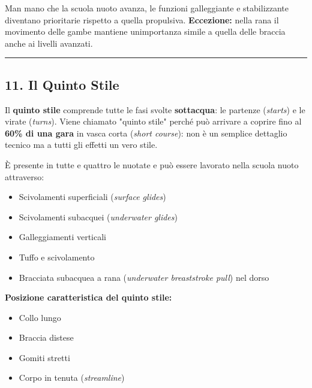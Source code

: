 \documentclass[a4paper,11pt]{article}
\providecommand{\tightlist}{%
  \setlength{\itemsep}{0pt}\setlength{\parskip}{0pt}}
\begin{document}
Man mano che la scuola nuoto avanza, le funzioni galleggiante e
stabilizzante diventano prioritarie rispetto a quella propulsiva.
\textbf{Eccezione:} nella rana il movimento delle gambe mantiene
un\textquotesingle importanza simile a quella delle braccia anche ai
livelli avanzati.

\begin{center}\rule{0.5\linewidth}{0.5pt}\end{center}

\subsection{11. Il Quinto Stile}\label{il-quinto-stile}

Il \textbf{quinto stile} comprende tutte le fasi svolte
\textbf{sott\textquotesingle acqua}: le partenze (\emph{starts}) e le
virate (\emph{turns}). Viene chiamato "quinto stile" perché può arrivare
a coprire fino al \textbf{60\% di una gara} in vasca corta (\emph{short
      course}): non è un semplice dettaglio tecnico ma a tutti gli effetti un
vero stile.

È presente in tutte e quattro le nuotate e può essere lavorato nella
scuola nuoto attraverso:

\begin{itemize}
      \tightlist
      \item
            Scivolamenti superficiali (\emph{surface glides})
      \item
            Scivolamenti subacquei (\emph{underwater glides})
      \item
            Galleggiamenti verticali
      \item
            Tuffo e scivolamento
      \item
            Bracciata subacquea a rana (\emph{underwater breaststroke pull}) nel
            dorso
\end{itemize}

\textbf{Posizione caratteristica del quinto stile:}

\begin{itemize}
      \tightlist
      \item
            Collo lungo
      \item
            Braccia distese
      \item
            Gomiti stretti
      \item
            Corpo in tenuta (\emph{streamline})
\end{itemize}
\end{document}
